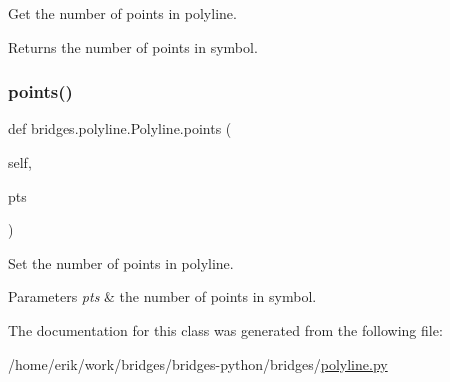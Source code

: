 Get the number of points in polyline. 

\begin{DoxyReturn}{Returns}
the number of points in symbol. 
\end{DoxyReturn}
\mbox{\label{classbridges_1_1polyline_1_1_polyline_ad543fcb38cb561b71d2ae2a9a88d9888}} 
\subsubsection{\texorpdfstring{points()}{points()}\hspace{0.1cm}{\footnotesize\ttfamily [2/2]}}
{\footnotesize\ttfamily def bridges.\+polyline.\+Polyline.\+points (\begin{DoxyParamCaption}\item[{}]{self,  }\item[{}]{pts }\end{DoxyParamCaption})}



Set the number of points in polyline. 


\begin{DoxyParams}{Parameters}
{\em pts} & the number of points in symbol. \\
\hline
\end{DoxyParams}


The documentation for this class was generated from the following file\+:\begin{DoxyCompactItemize}
\item 
/home/erik/work/bridges/bridges-\/python/bridges/\hyperlink{polyline_8py}{polyline.\+py}\end{DoxyCompactItemize}

